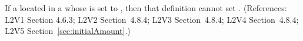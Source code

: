 If a \Species located in a \Compartment whose  is
set to , then that \Species definition cannot set
.  (References: L2V1 Section 4.6.3; L2V2
Section~4.8.4; L2V3 Section~4.8.4; L2V4 Section~4.8.4; L2V5 Section~\ref{sec:initialAmount}.)
